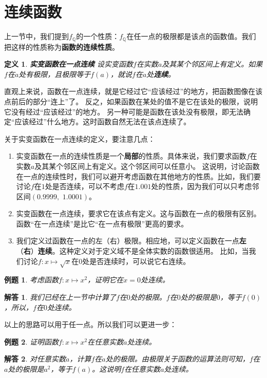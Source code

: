 \documentclass[12pt,UTF8]{ctexbook}
\newtheorem{df}{定义}[section]
\newtheorem{et}{例题}[section]
\newtheorem*{so}{解答}
\begin{document}
\section{连续函数}

上一节中，我们提到$f_{\mathbb{Q}}$的一个性质：$f_{\mathbb{Q}}$在任一点的极限都是该点的函数值。我们把这样的性质称为\textbf{函数的连续性质}。

\begin{df}{\textbf{实变函数在一点连续}}
    设实变函数$f$在实数$a$及其某个邻区间上有定义。如果$f$在$a$处有极限，且极限等于$f(a)$，就说$f$在$a$处\textbf{连续}。
\end{df}

直观上来说，函数在一点连续，就是它经过它“应该经过”的地方，把函数图像在该点前后的部分“连上”了。
反之，如果函数在某处的值不是它在该处的极限，说明它没有经过“应该经过”的地方。
另一种可能是函数在该处没有极限，即无法确定“应该经过”什么地方。这时函数自然无法在该点连续了。

关于实变函数在一点连续的定义，要注意几点：
\begin{enumerate}
    \item 实变函数在一点的连续性质是一个\textbf{局部}的性质。具体来说，我们要求函数$f$在实数$a$及其某个邻区间上有定义。这个邻区间可以任意小。
    这说明，讨论函数在一点的连续性时，我们可以避开考虑函数在其他地方的性质。比如，我们要讨论$f$在$1$处是否连续，可以不考虑$f$在$1.001$处的性质，因为我们可以只考虑邻区间$(0.9999,\,\,1.0001)$。
    \item 实变函数在一点连续，要求它在该点有定义。这与函数在一点的极限有区别。函数“在一点连续”是比它“在一点有极限”更高的要求。
    \item 我们定义过函数在一点的左（右）极限。相应地，可以定义函数在一点\textbf{左}（\textbf{右}）\textbf{连续}。这种定义对于定义域不是全体实数的函数很适用。
    比如，当我们讨论$f:x\mapsto \sqrt{x}$在$0$处是否连续时，可以说它右连续。
\end{enumerate}

\begin{et}
    考虑函数$f:x\mapsto x^2$，证明它在$x=0$处连续。
\end{et}
\begin{so}
    我们已经在上一节中计算了$f$在$0$处的极限。$f$在$0$处的极限是$0$，等于$f(0)$，所以，$f$在$0$处连续。
\end{so}

以上的思路可以用于任一点。所以我们可以更进一步：
\begin{et}
    证明函数$f:x\mapsto x^2$在任意实数$a$处连续。
\end{et}
\begin{so}
    对任意实数$a$，计算$f$在$a$处的极限。由极限关于函数的运算法则可知，$f$在$a$处的极限是$a^2$，等于$f(a)$。这说明$f$在任意实数$a$处连续。
\end{so}
\end{document}
